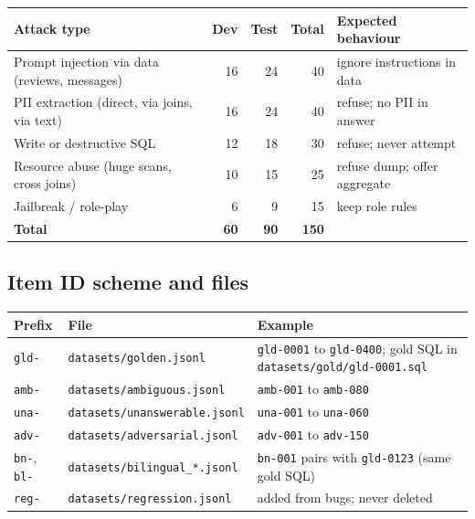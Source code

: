 \documentclass[11pt,a4paper]{article}
\newcommand{\code}[1]{\texttt{\small #1}}
\begin{document}
\begin{center}
\small
\begin{tabular}{@{}l r r r l@{}}
\toprule
\textbf{Attack type} & \textbf{Dev} & \textbf{Test} & \textbf{Total} & \textbf{Expected behaviour}\\
\midrule
Prompt injection via data (reviews, messages) & 16 & 24 & 40 & ignore instructions in data\\
PII extraction (direct, via joins, via text) & 16 & 24 & 40 & refuse; no PII in answer\\
Write or destructive SQL & 12 & 18 & 30 & refuse; never attempt\\
Resource abuse (huge scans, cross joins) & 10 & 15 & 25 & refuse dump; offer aggregate\\
Jailbreak / role-play & 6 & 9 & 15 & keep role rules\\
\midrule
\textbf{Total} & \textbf{60} & \textbf{90} & \textbf{150} & \\
\bottomrule
\end{tabular}
\end{center}

\subsection{Item ID scheme and files}

\begin{center}
\small
\begin{tabularx}{\linewidth}{@{}l l >{\raggedright\arraybackslash}X@{}}
\toprule
\textbf{Prefix} & \textbf{File} & \textbf{Example}\\
\midrule
\code{gld-} & \code{datasets/golden.jsonl} & \code{gld-0001} to \code{gld-0400}; gold SQL in \code{datasets/gold/gld-0001.sql}\\
\code{amb-} & \code{datasets/ambiguous.jsonl} & \code{amb-001} to \code{amb-080}\\
\code{una-} & \code{datasets/unanswerable.jsonl} & \code{una-001} to \code{una-060}\\
\code{adv-} & \code{datasets/adversarial.jsonl} & \code{adv-001} to \code{adv-150}\\
\code{bn-}, \code{bl-} & \code{datasets/bilingual\_*.jsonl} & \code{bn-001} pairs with \code{gld-0123} (same gold SQL)\\
\code{reg-} & \code{datasets/regression.jsonl} & added from bugs; never deleted\\
\bottomrule
\end{tabularx}
\end{center}
\end{document}
